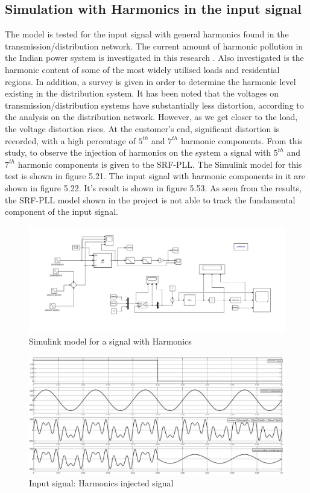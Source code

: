 \documentclass[a4paper,12pt]{iitmdiss}
\begin{document}
\subsection{Simulation with Harmonics in the input signal}

The model is tested for the input signal with general harmonics found in the transmission/distribution network. The current amount of harmonic pollution in the Indian power system is investigated in this research \cite{jain2004survey}. Also investigated is the harmonic content of some of the most widely utilised loads and residential regions. In addition, a survey is given in order to determine the harmonic level existing in the distribution system. It has been noted that the voltages on transmission/distribution systems have substantially less distortion, according to the analysis on the distribution network. However, as we get closer to the load, the voltage distortion rises. At the customer's end, significant distortion is recorded, with a high percentage of $5^{th}$ and $7^{th}$ harmonic components. From this study, to observe the injection of harmonics on the system a signal with $5^{th}$ and $7^{th}$ harmonic components is given to the SRF-PLL. 
The Simulink model for this test is shown in figure 5.21. The input signal with harmonic components in it are shown in figure 5.22. It's result is shown in figure 5.53. As seen from the results, the SRF-PLL model shown in the project is not able to track the fundamental component of the input signal.


\begin{figure}[hbt!]
    \centering
    \includegraphics[width=1.0\textwidth]{Harmonics_model.jpg}
    \caption{Simulink model for a signal with Harmonics}
\end{figure}

\begin{figure}[hbt!]
    \centering
    \includegraphics[width=1.0\textwidth]{Harmonics_Input.jpg}
    \caption{Input signal: Harmonics injected signal}
\end{figure}
\end{document}
